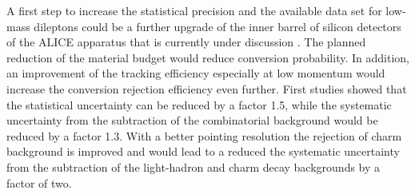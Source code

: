 \documentclass[../report.tex]{subfiles}
\begin{document}
A first step to increase the statistical precision and the available data set for low-mass dileptons could be a further upgrade of the inner barrel of silicon detectors of the ALICE apparatus that is currently under discussion \cite{ALICE:ITS3LoI}. The planned reduction of the material budget would reduce conversion probability. In addition, an improvement of the tracking efficiency especially at low momentum would increase the conversion rejection efficiency even further. First studies \cite{ALICE:ITS3LoI} showed that the statistical uncertainty can be reduced by a factor 1.5, while the systematic uncertainty from the subtraction of the combinatorial background would be reduced by a factor 1.3. With a better pointing resolution the rejection of charm background is improved and would lead to a reduced the systematic uncertainty from the subtraction of the light-hadron and charm decay backgrounds by a factor of two. 
\end{document}

